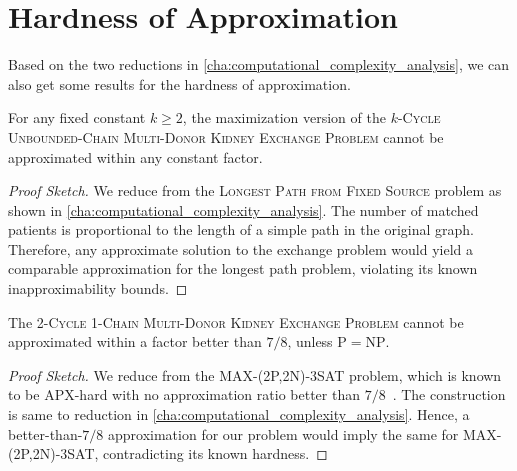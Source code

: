 \section{Hardness of Approximation}

Based on the two reductions in \autoref{cha:computational_complexity_analysis}, we can also get some results for the  hardness of approximation.

\begin{lemma}
For any fixed constant $k \ge 2$, the maximization version of the \textsc{$k$-Cycle Unbounded-Chain Multi-Donor Kidney Exchange Problem} cannot be approximated within any constant factor.
\end{lemma}

\begin{proof}[Proof Sketch]
We reduce from the \textsc{Longest Path from Fixed Source} problem as shown in \autoref{cha:computational_complexity_analysis}. The number of matched patients is proportional to the length of a simple path in the original graph. Therefore, any approximate solution to the exchange problem would yield a comparable approximation for the longest path problem, violating its known inapproximability bounds.
\end{proof}

\begin{lemma}
The \textsc{2-Cycle 1-Chain Multi-Donor Kidney Exchange Problem} cannot be approximated within a factor better than $7/8$, unless $\mathrm{P} = \mathrm{NP}$.
\end{lemma}

\begin{proof}[Proof Sketch]
We reduce from the \textsc{MAX-(2P,2N)-3SAT} problem, which is known to be APX-hard with no approximation ratio better than $7/8$~\cite{berman2003restricted}. The construction is same to reduction in \autoref{cha:computational_complexity_analysis}. Hence, a better-than-$7/8$ approximation for our problem would imply the same for \textsc{MAX-(2P,2N)-3SAT}, contradicting its known hardness.
\end{proof}



